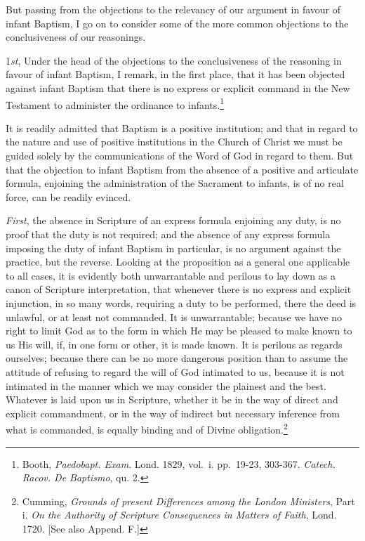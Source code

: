 \documentclass[english,]{book}
\begin{document}
But passing from the objections to the relevancy of our argument in favour of infant Baptism, I go on to consider some of the more common objections to the conclusiveness of our reasonings.

1\emph{st}, Under the head of the objections to the conclusiveness of the reasoning in favour of infant Baptism, I remark, in the first place, that it has been objected against infant Baptism that there is no express or explicit command in the New Testament to administer the ordinance to infants.\footnote{Booth, \emph{Paedobapt. Exam}. Lond. 1829, vol.~i. pp.~19-23, 303-367. \emph{Catech. Racov. De Baptismo}, qu. 2.}

It is readily admitted that Baptism is a positive institution; and that in regard to the nature and use of positive institutions in the Church of Christ we must be guided solely by the communications of the Word of God in regard to them. But that the objection to infant Baptism from the absence of a positive and articulate formula, enjoining the administration of the Sacrament to infants, is of no real force, can be readily evinced.

\emph{First}, the absence in Scripture of an express formula enjoining any duty, is no proof that the duty is not required; and the absence of any express formula imposing the duty of infant Baptism in particular, is no argument against the practice, but the reverse. Looking at the proposition as a general one applicable to all cases, it is evidently both unwarrantable and perilous to lay down as a canon of Scripture interpretation, that whenever there is no express and explicit injunction, in so many words, requiring a duty to be performed, there the deed is unlawful, or at least not commanded. It is unwarrantable; because we have no right to limit God as to the form in which He may be pleased to make known to us His will, if, in one form or other, it is made known. It is perilous as regards ourselves; because there can be no more dangerous position than to assume the attitude of refusing to regard the will of God intimated to us, because it is not intimated in the manner which we may consider the plainest and the best. Whatever is laid upon us in Scripture, whether it be in the way of direct and explicit commandment, or in the way of indirect but necessary inference from what is commanded, is equally binding and of Divine obligation.\footnote{Cumming, \emph{Grounds of present Differences among the London Ministers}, Part i. \emph{On the Authority of Scripture Consequences in Matters of Faith}, Lond. 1720. {[}See also Append. F.{]}}
\end{document}
